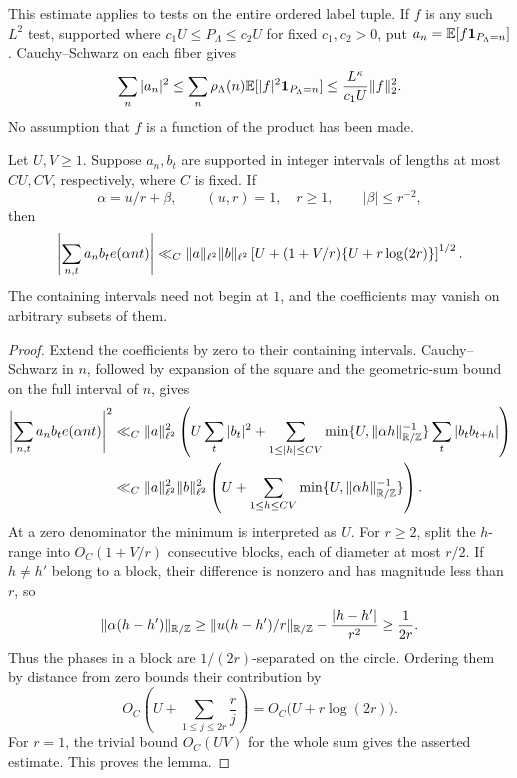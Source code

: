 This estimate applies to tests on the entire ordered label tuple.
If $f$ is any such $L^2$ test, supported where $c_1U\leq
P_\Lambda\leq c_2U$ for fixed $c_1,c_2>0$, put
$a_n=\mathbb E[f\mathbf 1_{P_\Lambda=n}]$.  Cauchy--Schwarz on each fiber gives
\begin{equation}\label{eq:ideal-collapse}
 \sum_n|a_n|^2
 \leq\sum_n\rho_\Lambda(n)
                 \mathbb E[|f|^2\mathbf 1_{P_\Lambda=n}]
 \leq\frac{L^\kappa}{c_1U}\lVert f\rVert_2^2.
\end{equation}
No assumption that $f$ is a function of the product has been made.

\begin{lemma}\label{lem:bilinear}
Let $U,V\geq1$.  Suppose $a_n,b_t$ are supported in integer
intervals of lengths at most $C U,C V$, respectively, where $C$ is
fixed.  If
\[
 \alpha=u/r+\beta,\qquad (u,r)=1,\quad r\geq1,
 \qquad |\beta|\leq r^{-2},
\]
then
\begin{equation}\label{eq:integer-bilinear}
 \left|\sum_{n,t}a_nb_te\!\left(\alpha nt\right)\right|
 \ll_C \lVert a\rVert_{\ell^2}\lVert b\rVert_{\ell^2}
 \left[U+(1+V/r)\{U+r\log(2r)\}\right]^{1/2}.
\end{equation}
The containing intervals need not begin at $1$, and the
coefficients may vanish on arbitrary subsets of them.
\end{lemma}

\begin{proof}
Extend the coefficients by zero to their containing intervals.
Cauchy--Schwarz in $n$, followed by expansion of the square and
the geometric-sum bound on the full interval of $n$, gives
\begin{align*}
 \left|\sum_{n,t}a_nb_te\!\left(\alpha nt\right)\right|^2
 &\ll_C\lVert a\rVert_{\ell^2}^2
 \left(U\sum_t|b_t|^2+
   \sum_{1\leq |h|\leq CV}
    \min\{U,\lVert \alpha h\rVert_{\mathbb R/\mathbb Z}^{-1}\}
       \sum_t|b_t b_{t+h}|\right)\\
 &\ll_C\lVert a\rVert_{\ell^2}^2\lVert b\rVert_{\ell^2}^2
  \left(U+\sum_{1\leq h\leq CV}
         \min\{U,\lVert \alpha h\rVert_{\mathbb R/\mathbb Z}^{-1}\}\right).
\end{align*}
At a zero denominator the minimum is interpreted as $U$.
For $r\geq2$, split the $h$-range into
$O_C(1+V/r)$ consecutive blocks, each of diameter at most $r/2$.
If $h\ne h'$ belong to a block, their difference is nonzero and
has magnitude less than $r$, so
\[
 \lVert \alpha(h-h')\rVert_{\mathbb R/\mathbb Z}
 \geq\lVert u(h-h')/r\rVert_{\mathbb R/\mathbb Z}
            -\frac{|h-h'|}{r^2}\geq\frac1{2r}.
\]
Thus the phases in a block are $1/(2r)$-separated on the circle.
Ordering them by distance from zero bounds their contribution by
\[
 O_C\left(U+\sum_{1\leq j\leq 2r}\frac rj\right)
 =O_C\bigl(U+r\log(2r)\bigr).
\]
For $r=1$, the trivial bound $O_C(UV)$ for the whole sum gives
the asserted estimate.  This proves the lemma.
\end{proof}


